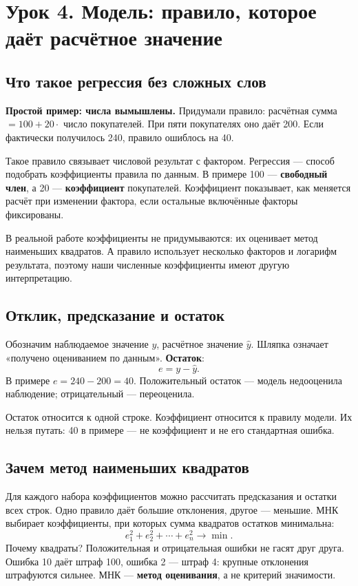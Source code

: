 \documentclass[12pt,a4paper]{article}
\newcommand{\toy}[1]{\par\textbf{Простой пример: числа вымышлены.} #1\par}
\begin{document}
\section{Урок 4. Модель: правило, которое даёт расчётное значение}

\subsection{Что такое регрессия без сложных слов}

\toy{Придумали правило: расчётная сумма $=100+20\cdot$ число покупателей. При пяти покупателях оно даёт 200. Если фактически получилось 240, правило ошиблось на 40.}

Такое правило связывает числовой результат с фактором. Регрессия --- способ подобрать коэффициенты правила по данным. В примере 100 --- \textbf{свободный член}, а 20 --- \textbf{коэффициент} покупателей. Коэффициент показывает, как меняется расчёт при изменении фактора, если остальные включённые факторы фиксированы.

В реальной работе коэффициенты не придумываются: их оценивает метод наименьших квадратов. А правило использует несколько факторов и логарифм результата, поэтому наши численные коэффициенты имеют другую интерпретацию.

\subsection{Отклик, предсказание и остаток}

Обозначим наблюдаемое значение $y$, расчётное значение $\widehat y$. Шляпка означает «получено оцениванием по данным». \textbf{Остаток}:
\[
 e=y-\widehat y.
\]
В примере $e=240-200=40$. Положительный остаток --- модель недооценила наблюдение; отрицательный --- переоценила.

Остаток относится к одной строке. Коэффициент относится к правилу модели. Их нельзя путать: 40 в примере --- не коэффициент и не его стандартная ошибка.

\subsection{Зачем метод наименьших квадратов}

Для каждого набора коэффициентов можно рассчитать предсказания и остатки всех строк. Одно правило даёт большие отклонения, другое --- меньшие. МНК выбирает коэффициенты, при которых сумма квадратов остатков минимальна:
\[
 e_1^2+e_2^2+\cdots+e_n^2\longrightarrow\min.
\]
Почему квадраты? Положительная и отрицательная ошибки не гасят друг друга. Ошибка 10 даёт штраф 100, ошибка 2 --- штраф 4: крупные отклонения штрафуются сильнее. МНК --- \textbf{метод оценивания}, а не критерий значимости.
\end{document}
